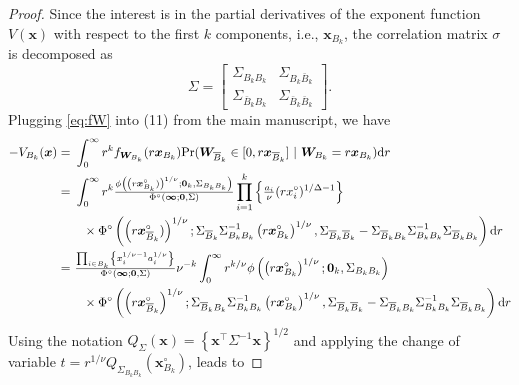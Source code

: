 \documentclass[lineno]{biometrika}
\begin{document}
\begin{proof}
Since the interest is in the partial derivatives of the exponent function $V(\bm x)$ with respect to the first $k$ components, i.e.,  $\bm x_{B_k}$, the correlation matrix $\sigma$ is decomposed as
$$\Sigma = \begin{bmatrix}
 \Sigma_{B_k B_k} &  \Sigma_{B_k \bar{B}_k} \\
  \Sigma_{\bar{B}_k B_k} &  \Sigma_{\bar{B}_k \bar{B}_k}	
 \end{bmatrix}.
$$
Plugging \eqref{eq:fW} into (11) from the main manuscript, we have
%
\begin{align*}
 -V_{B_k}(\bm x) =&\ \int_0^\infty r^k f_{\bm W_{B_k}}(r \bm x_{B_k})  {\rm Pr}(\bm W_{{\overline{B}}_k} \in [0, r \bm x_{{\overline{B}}_k} ]\ | \ \bm W_{B_k} = r \bm x_{B_k} )\text dr \\
=&\ \int_0^\infty r^k {\textstyle{\phi\left( \left( r \bm x_{B_k}^\circ) \right)^{1/\nu}; \bm 0_{k}, \Sigma_{B_k B_k}\right)\over\Phi^\circ(\bm \infty;\bm 0, \Sigma)}} 
\prod_{i=1}^k \left\{ {\textstyle{a_i\over\nu}}(r x_i^\circ)^{1/\Delta-1} \right\} \\
&\quad \times \Phi^\circ \left( \left(r \bm x_{{\overline{B}}_k}^\circ)\right)^{1/\nu};
\Sigma_{{\overline{B}}_k}\Sigma_{B_k B_k}^{-1} \left(r \bm x_{B_k}^\circ\right)^{1/\nu},\Sigma_{{\overline{B}}_k{\overline{B}}_k}-\Sigma_{{\overline{B}}_k B_k}\Sigma_{B_k B_k}^{-1}\Sigma_{{\overline{B}}_k B_k} \right)  \text dr \\
=&\ {\textstyle{\prod_{i\in B_k} \left\{ x_i^{1/\nu-1}a_i^{1/\nu}\right\}\over\Phi^\circ(\bm \infty;\bm 0, \Sigma)}} \nu^{-k} \int_0^\infty r^{k/\nu} \phi\left( \left( r \bm x_{B_k}^\circ\right)^{1/\nu}; \bm 0_k, \Sigma_{B_k B_k}\right) \\
&\quad \times \Phi^\circ \left( \left(r \bm x_{{\overline{B}}_k}^\circ \right)^{1/\nu};
\Sigma_{{\overline{B}}_k B_k}\Sigma_{B_k B_k}^{-1} \left(r \bm x_{B_k}^\circ\right)^{1/\nu},\Sigma_{{\overline{B}}_k {\overline{B}}_k}-\Sigma_{{\overline{B}}_k B_k}\Sigma_{B_k B_k}^{-1}\Sigma_{{\overline{B}}_k B_k}\right) \text dr\\
\end{align*} 
%
Using the notation $Q_\Sigma \left( \bm x \right) = \left\{ \bm x^\top \Sigma^{-1} \bm x\right\}^{1/2}$ and applying the change of variable $t=r^{1/\nu}Q_{\Sigma_{B_k B_k}}(\bm x_{B_k}^\circ)$, leads to 


\end{proof}
\end{document}
